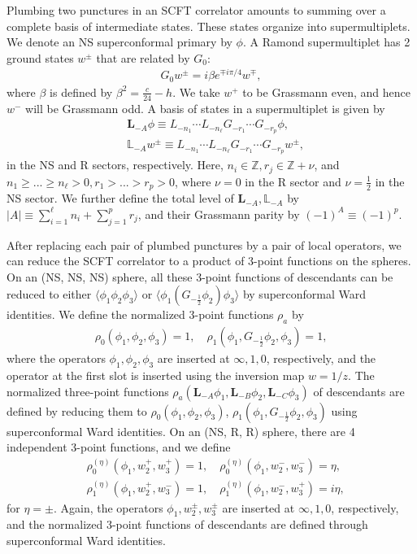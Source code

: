 \documentclass[12pt]{article}
\def\ie{\begin{equation}\begin{aligned}}
\def\fe{\end{aligned}\end{equation}}
\begin{document}
Plumbing two punctures in an SCFT correlator amounts to summing over a complete basis of intermediate states. These states organize into supermultiplets. We denote an NS superconformal primary by $\phi$. A Ramond supermultiplet has 2 ground states $w^\pm$ that are related by $G_0$:
\ie
G_0 w^\pm = i \beta e^{\mp i\pi/4} w^\mp,
\fe
where $\beta$ is defined by $\beta^2 = \frac{c}{24}-h$. We take $w^+$ to be Grassmann even, and hence $w^-$ will be Grassmann odd. A basis of states in a supermultiplet is given by 
\ie
&\mathbf{L}_{-A}\phi \equiv L_{-n_1}\cdots L_{-n_\ell} G_{-r_1}\cdots G_{-r_p} \phi,\\
&\mathbb{L}_{-A} w^\pm \equiv L_{-n_1}\cdots L_{-n_\ell} G_{-r_1}\cdots G_{-r_p} w^\pm,
\fe
in the NS and R sectors, respectively. Here, $n_i\in \mathbb{Z}, r_j\in \mathbb{Z}+\nu$, and $n_1 \geq ... \geq n_\ell>0, r_1>...>r_p>0$, where $\nu=0$ in the R sector and $\nu=\frac{1}{2}$ in the NS sector. We further define the total level of $\mathbf{L}_{-A}, \mathbb{L}_{-A}$ by $|A|\equiv \sum_{i=1}^\ell n_i + \sum_{j=1}^{p} r_j$, and their Grassmann parity by $(-1)^A \equiv (-1)^{p}$.  

After replacing each pair of plumbed punctures by a pair of local operators, we can reduce the SCFT correlator to a product of 3-point functions on the spheres. On an (NS, NS, NS) sphere, all these 3-point functions of descendants can be reduced to either $\langle \phi_1 \phi_2 \phi_3\rangle $ or $\langle \phi_1 (G_{-\frac{1}{2}}\phi_2) \phi_3\rangle $ by superconformal Ward identities. We define the normalized 3-point functions $\rho_a$ by
\ie
\rho_0(\phi_1, \phi_2, \phi_3)=1,\quad \rho_1(\phi_1, G_{-\frac{1}{2}}\phi_2, \phi_3)=1,
\fe
where the operators $\phi_1, \phi_2, \phi_3$ are inserted at $\infty, 1, 0$, respectively, and the operator at the first slot is inserted using the inversion map $w=1/z$. The normalized three-point functions $\rho_a(\mathbf{L}_{-A}\phi_1, \mathbf{L}_{-B}\phi_2,\mathbf{L}_{-C}\phi_3)$ of descendants are defined by reducing them to $\rho_0(\phi_1, \phi_2, \phi_3)$, $\rho_1(\phi_1, G_{-\frac{1}{2}}\phi_2, \phi_3)$ using superconformal Ward identities. On an (NS, R, R) sphere, there are 4 independent 3-point functions, and we define 
\ie
&\rho^{(\eta)}_0(\phi_1, w^+_2, w_3^+) = 1,\quad \rho^{(\eta)}_0(\phi_1, w^-_2, w_3^-) = \eta,\\
&\rho^{(\eta)}_1(\phi_1, w^+_2, w_3^-) = 1,\quad \rho^{(\eta)}_1(\phi_1, w^-_2, w_3^+) = i\eta,
\fe
for $\eta = \pm$. Again, the operators $\phi_1, w_2^\pm, w_3^\pm$ are inserted at $\infty, 1, 0$, respectively, and the normalized 3-point functions of descendants are defined through superconformal Ward identities. 
\end{document}
